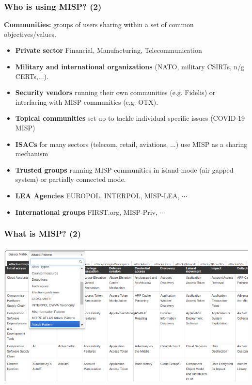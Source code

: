 \begin{frame}
    \frametitle{Who is using MISP? (2)}
    {\bf Communities:} groups of users sharing within a set of common objectives/values.
    \vspace{0.5em}
    \begin{itemize}
        \item {\bf Private sector} Financial, Manufacturing, Telecommunication
        \item {\bf Military and international organizations} (NATO, military CSIRTs, n/g CERTs,...).
        \item {\bf Security vendors} running their own communities (e.g. Fidelis) or interfacing with MISP communities (e.g. OTX).
        \item {\bf Topical communities} set up to tackle individual specific issues (COVID-19 MISP)
        \item {\bf ISACs} for many sectors (telecom, retail, aviations, ...) use MISP as a sharing mechanism
        \item {\bf Trusted groups} running MISP communities in island mode (air gapped system) or partially connected mode.
        \item {\bf LEA Agencies} EUROPOL, INTERPOL, MISP-LEA, $\cdots$
        \item {\bf International groups} FIRST.org, MISP-Priv, $\cdots$
    \end{itemize}
\end{frame}

\begin{frame}
    \frametitle{What is MISP? (2)}
    \begin{center}
        \includegraphics[width=1.0\linewidth]{galaxy-matrix.png}
    \end{center}
\end{frame}

